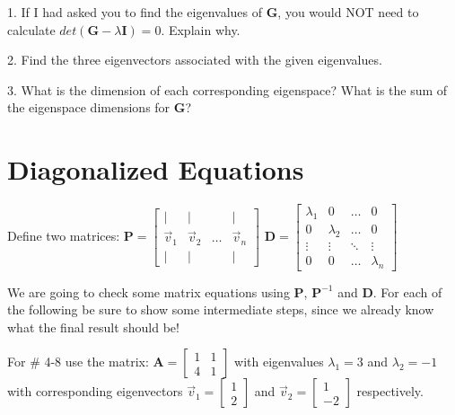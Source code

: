 \documentclass{article}
\begin{document}
\begin{flushleft}
\vspace{0.25in}
1. If I had asked you to find the eigenvalues of \textbf{G}, you would NOT need to calculate $det(\textbf{G}-\lambda \textbf{I})=0$. Explain why.

\vspace{1in}

2. Find the three eigenvectors associated with the given eigenvalues.

\vspace{3in}

3. What is the dimension of each corresponding eigenspace? What is the sum of the eigenspace dimensions for \textbf{G}?

\vspace{1in}

\section*{Diagonalized Equations}
Define two matrices: $\textbf{P} = \begin{bmatrix}
| & | & & |\\
\vec{v}_1 & \vec{v}_2 & \ldots &\vec{v}_n \\
| & | & & |
\end{bmatrix} $
\hspace{0.5in}
$\textbf{D} = \begin{bmatrix}
\lambda_1 & 0 & \ldots & 0 \\
0 & \lambda_2 & \ldots & 0 \\
\vdots & \vdots & \ddots & \vdots \\
0 & 0 & \ldots & \lambda_n 
\end{bmatrix} $

\vspace{0.1in}

We are going to check some matrix equations using \textbf{P}, $\textbf{P}^{-1}$ and \textbf{D}. 
For each of the following be sure to show some intermediate steps, since we already know what the final result should be!

\vspace{0.1in}

For \# 4-8 use the matrix: $\textbf{A} = \begin{bmatrix} 1 & 1 \\ 4 & 1 \end{bmatrix}$ \hspace{0.2in} with eigenvalues $\lambda_1 = 3$ and $\lambda_2 = -1$ with corresponding eigenvectors $\vec{v}_1 = \begin{bmatrix} 1 \\ 2 \end{bmatrix}$ and $\vec{v}_2 = \begin{bmatrix} 1 \\ -2 \end{bmatrix}$ respectively.


\end{flushleft}
\end{document}
